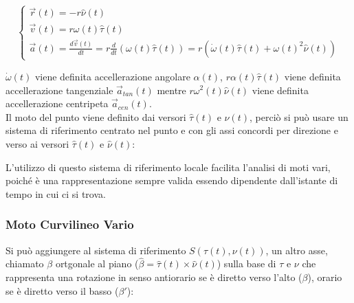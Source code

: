 \documentclass{article}
\numberwithin{equation}{subsection}
\begin{document}
\begin{equation}
    \begin{cases}
        \vec{r}(t)=-r\hat{\nu}(t)\\
        \vec{v}(t)=r\omega(t)\hat{\tau}(t)\\
        \vec{a}(t)=\displaystyle\frac{d\vec{v}(t)}{dt}
        =r\frac{d}{dt}(\omega(t)\hat{\tau}(t))
        =r(\dot\omega(t)\hat{\tau}(t)+\omega(t)^{2}\hat{\nu}(t))
    \end{cases}
\end{equation}

$\dot\omega(t)$ viene definita accellerazione angolare $\alpha(t)$, 
$r\alpha(t)\hat{\tau}(t)$ viene definita accellerazione tangenziale 
$\vec{a}_{tan}(t)$ mentre $r\omega^{2}(t)\hat{\nu}(t)$ viene definita 
accellerazione centripeta $\vec{a}_{cen}(t)$.
\\
Il moto del punto viene definito dai versori $\hat{\tau}(t)$ e $\hat{\nu}(t)$, 
perciò si può usare un sistema di riferimento centrato nel punto e con gli assi 
concordi per direzione e verso ai versori $\hat{\tau}(t)$ e $\hat{\nu}(t)$:

\begin{center}\end{center}

L'utilizzo di questo sistema di riferimento locale facilita 
l'analisi di moti vari, poiché è una rappresentazione sempre 
valida essendo dipendente dall'istante di tempo in cui ci 
si trova.

\subsubsection{Moto Curvilineo Vario}
Si può aggiungere al sistema di riferimento $S(\tau(t), \nu(t))$, un altro 
asse, chiamato $\beta$ ortgonale al piano ($\hat{\beta}=\hat{\tau}(t)\times\hat{\nu}(t)$) sulla base di $\tau$ e $\nu$ 
che rappresenta una rotazione in senso antiorario se è diretto 
verso l'alto ($\beta$), orario se è diretto verso il basso ($\beta'$):
\end{document}
